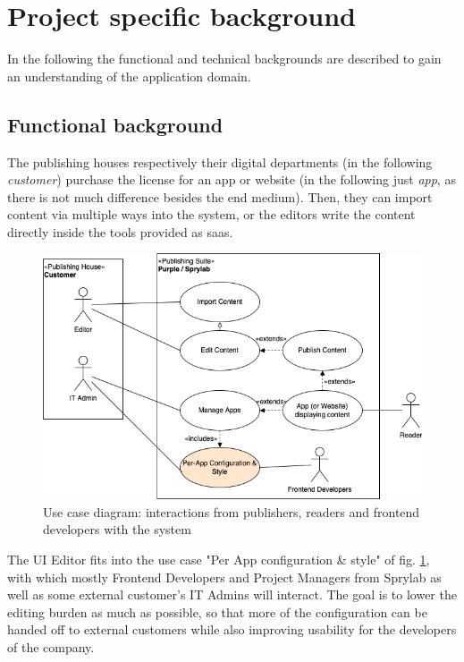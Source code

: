 \section{Project specific background}

In the following the functional and technical backgrounds are described to gain an understanding of the application domain.

\subsection{Functional background}

The publishing houses respectively their digital departments (in the following \textit{customer}) purchase the license for an app or website (in the following just \textit{app}, as there is not much difference besides the end medium).
Then, they can import content via multiple ways into the system, or the editors write the content directly inside the tools provided as \Gls{saas}.

\begin{figure}[h!]
  \includegraphics[width=\textwidth]{pics/purple-abstract.drawio.png}
  \caption{Use case diagram: interactions from publishers, readers and frontend developers with the system}
  \label{fig:usecase1}
\end{figure}

The UI Editor fits into the use case "Per App configuration \& style" of fig. \ref*{fig:usecase1}, with which mostly Frontend Developers and Project Managers from Sprylab as well as some external customer's IT Admins will interact. The goal is to lower the editing burden as much as possible, so that more of the configuration can be handed off to external customers while also improving usability for the developers of the company.

